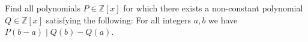 Find all polynomials $P \in \mathbb{Z}[x]$ for which there exists a non-constant polynomial
$Q \in \mathbb{Z}[x]$ satisfying the following:
For all integers $a,b$ we have $P(b-a) \mid Q(b) - Q(a)$.
